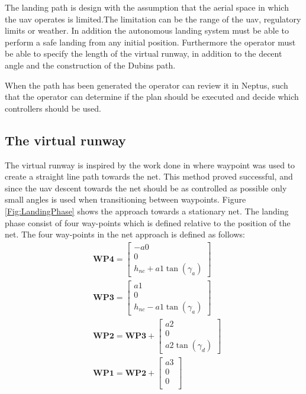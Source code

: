 The landing path is design with the assumption that the aerial space in which the \gls{uav} operates is limited.The limitation can be the range of the uav, regulatory limits or weather. In addition the autonomous landing system must be able to perform a safe landing from any initial position. Furthermore the operator must be able to specify the length of the virtual runway, in addition to the decent angle and the construction of the Dubins path.

When the path has been generated the operator can review it in Neptus, such that the operator can determine if the plan should be executed and decide which controllers should be used.  
\subsection{The virtual runway}\label{SS:netApproach}
The virtual runway is inspired by the work done in \citep{Skulstad&Syversen} where waypoint was used to create a straight line path towards the net. This method proved successful, and since the \gls{uav} descent towards the net should be as controlled as possible only small angles is used when transitioning between waypoints. Figure \ref{Fig:LandingPhase} shows the approach towards a stationary net. The landing phase consist of four way-points which is defined relative to the position of the net. The four way-points in the net approach is defined as follows:
\begin{subequations}
\begin{align}
&\mathbf{WP4} = 
\begin{bmatrix}
-a0 \\
0 \\
h_{nc} + a1\tan(\gamma_a) 
\end{bmatrix}\\
&\mathbf{WP3} = 
\begin{bmatrix}
a1 \\
0 \\
h_{nc} - a1\tan(\gamma_a)
\end{bmatrix}\\
&\mathbf{WP2} = \mathbf{WP3} + 
\begin{bmatrix}
a2 \\
0 \\
a2\tan(\gamma_d)
\end{bmatrix}\\
&\mathbf{WP1} = \mathbf{WP2} + 
\begin{bmatrix}
a3 \\
0 \\
0 \\
\end{bmatrix}
\end{align}
\end{subequations}
